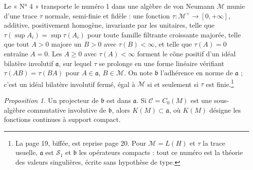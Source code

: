 \documentclass[11pt,a4paper]{article}
\begin{document}
Le « N° 4 » transporte le numéro 1 dans une algèbre de von Neumann
$\mathcal{M}$ munie d'une trace $\tau$ normale, semi-finie et fidèle : une
fonction $\tau : \mathcal{M}^{+} \to [0,+\infty]$, additive, positivement
homogène, invariante par les unitaires, telle que $\tau(\sup A_i) = \sup
\tau(A_i)$ pour toute famille filtrante croissante majorée, telle que tout
$A > 0$ majore un $B > 0$ avec $\tau(B) < \infty$, et telle que $\tau(A) = 0$
entraîne $A = 0$. Les $A \geq 0$ avec $\tau(A) < \infty$ forment le cône
positif d'un idéal bilatère involutif $\mathfrak{a}$, sur lequel $\tau$ se
prolonge en une forme linéaire vérifiant $\tau(AB) = \tau(BA)$ pour
$A \in \mathfrak{a}$, $B \in \mathcal{M}$. On note $\mathfrak{b}$
l'adhérence en norme de $\mathfrak{a}$ ; c'est un idéal bilatère involutif
fermé, égal à $\mathcal{M}$ si et seulement si $\tau$ est finie.\footnote{La
page 19, biffée, est reprise page 20. Pour $\mathcal{M} = L(H)$ et $\tau$ la
trace usuelle, $\mathfrak{a}$ est $\mathcal{S}_1$ et $\mathfrak{b}$ les
opérateurs compacts : tout ce numéro est la théorie des valeurs singulières,
écrite sans hypothèse de type.}

\emph{Proposition 1.} Un projecteur de $\mathfrak{b}$ est dans $\mathfrak{a}$.
Si $\mathcal{C} = C_0(M)$ est une sous-algèbre commutative involutive de
$\mathfrak{b}$, alors $K(M) \subset \mathfrak{a}$, où $K(M)$ désigne les
fonctions continues à support compact.
\end{document}
